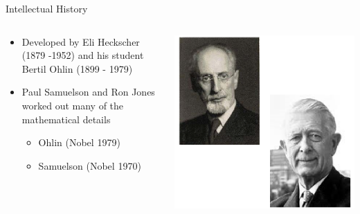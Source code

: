 \documentclass[10pt,hyperref={CJKbookmarks=true},xcolor=dvipsnames,aspectratio=169]{beamer}
\begin{document}
\begin{frame}{Intellectual History}


\begin{columns}[onlytextwidth]
\begin{column}{0.5\textwidth}
\begin{itemize}
\item Developed by Eli Heckscher (1879 -1952) and his student Bertil Ohlin
(1899 - 1979) 
\item Paul Samuelson and Ron Jones worked out many of the mathematical details 

	\begin{itemize}
		\item Ohlin (Nobel 1979)
		\item Samuelson (Nobel 1970)
	\end{itemize}
\end{itemize}

\end{column}
\begin{column}{0.5\textwidth}
\includegraphics[width=0.9\columnwidth]{fig/ho/lec5-4}
\end{column}
\end{columns}

\end{frame}
\end{document}
